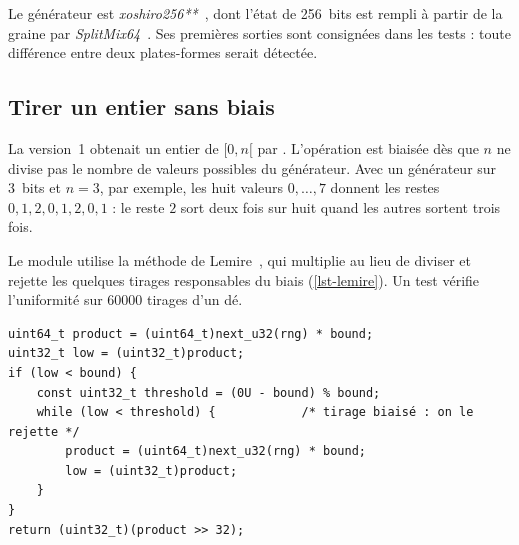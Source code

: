 Le générateur est \emph{xoshiro256**}~\cite{blackman2021}, dont l'état de 256~bits est
rempli à partir de la graine par \emph{SplitMix64}~\cite{steele2014}. Ses premières sorties
sont consignées dans les tests : toute différence entre deux plates-formes serait détectée.

\subsection{Tirer un entier sans biais}

La version~1 obtenait un entier de $[0, n[$ par . L'opération est biaisée
dès que $n$ ne divise pas le nombre de valeurs possibles du générateur. Avec un générateur
sur 3~bits et $n = 3$, par exemple, les huit valeurs $0, \dots, 7$ donnent les restes
$0, 1, 2, 0, 1, 2, 0, 1$ : le reste $2$ sort deux fois sur huit quand les autres sortent
trois fois.

Le module utilise la méthode de Lemire~\cite{lemire2019}, qui multiplie au lieu de diviser
et rejette les quelques tirages responsables du biais (\cref{lst-lemire}). Un test vérifie
l'uniformité sur \num{60000} tirages d'un dé.

\begin{lstlisting}[caption={Entier uniforme dans $[0, \mathit{bound}[$
                            (\fichier{src/core/rng.c}).}, label={lst-lemire}]
uint64_t product = (uint64_t)next_u32(rng) * bound;
uint32_t low = (uint32_t)product;
if (low < bound) {
    const uint32_t threshold = (0U - bound) % bound;
    while (low < threshold) {            /* tirage biaisé : on le rejette */
        product = (uint64_t)next_u32(rng) * bound;
        low = (uint32_t)product;
    }
}
return (uint32_t)(product >> 32);
\end{lstlisting}
